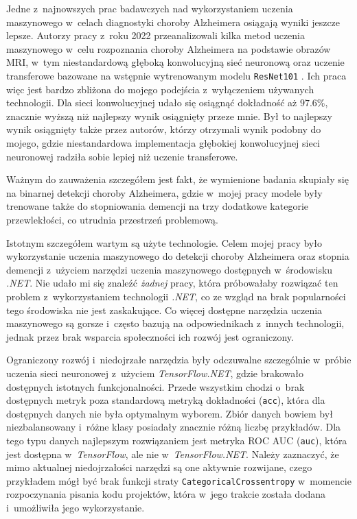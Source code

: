 Jedne z~najnowszych prac badawczych nad wykorzystaniem uczenia maszynowego w~celach diagnostyki choroby Alzheimera osiągają wyniki jeszcze lepsze.
Autorzy pracy z~roku 2022 przeanalizowali kilka metod uczenia maszynowego w~celu rozpoznania choroby Alzheimera na podstawie obrazów MRI, w~tym niestandardową głęboką konwolucyjną sieć neuronową oraz uczenie transferowe bazowane na wstępnie wytrenowanym modelu \lstinline{ResNet101} \cite{mamun2022deep}.
Ich praca więc jest bardzo zbliżona do mojego podejścia z~wyłączeniem używanych technologii.
Dla sieci konwolucyjnej udało się osiągnąć dokładność aż $97.6\%$, znacznie wyższą niż najlepszy wynik osiągnięty przeze mnie.
Był to najlepszy wynik osiągnięty także przez autorów, którzy otrzymali wynik podobny do mojego, gdzie niestandardowa implementacja głębokiej konwolucyjnej sieci neuronowej radziła sobie lepiej niż uczenie transferowe.

Ważnym do zauważenia szczegółem jest fakt, że wymienione badania skupiały się na binarnej detekcji choroby Alzheimera, gdzie w~mojej pracy modele były trenowane także do stopniowania demencji na trzy dodatkowe kategorie przewlekłości, co utrudnia przestrzeń problemową.

Istotnym szczegółem wartym są użyte technologie.
Celem mojej pracy było wykorzystanie uczenia maszynowego do detekcji choroby Alzheimera oraz stopnia demencji z~użyciem narzędzi uczenia maszynowego dostępnych w~środowisku \emph{.NET}.
Nie udało mi się znaleźć \emph{żadnej} pracy, która próbowałaby rozwiązać ten problem z~wykorzystaniem technologii \emph{.NET}, co ze wzgląd na brak popularności tego środowiska nie jest zaskakujące.
Co więcej dostępne narzędzia uczenia maszynowego są gorsze i~często bazują na odpowiednikach z~innych technologii, jednak przez brak wsparcia społeczności ich rozwój jest ograniczony.

Ograniczony rozwój i~niedojrzałe narzędzia były odczuwalne szczególnie w~próbie uczenia sieci neuronowej z~użyciem \emph{TensorFlow.NET}, gdzie brakowało dostępnych istotnych funkcjonalności.
Przede wszystkim chodzi o~brak dostępnych metryk poza standardową metryką dokładności (\lstinline{acc}), która dla dostępnych danych nie była optymalnym wyborem.
Zbiór danych bowiem był niezbalansowany i~różne klasy posiadały znacznie różną liczbę przykładów.
Dla tego typu danych najlepszym rozwiązaniem jest metryka ROC AUC (\lstinline{auc}), która jest dostępna w~\emph{TensorFlow}, ale nie w~\emph{TensorFlow.NET}.
Należy zaznaczyć, że mimo aktualnej niedojrzałości narzędzi są one aktywnie rozwijane, czego przykładem mógł być brak funkcji straty \lstinline{CategoricalCrossentropy} w~momencie rozpoczynania pisania kodu projektów, która w~jego trakcie została dodana i~umożliwiła jego wykorzystanie.

